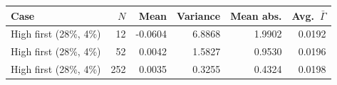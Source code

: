 \begin{tabular}{lrrrrr}
\toprule
Case & $N$ & Mean & Variance & Mean abs. & Avg.\ $\bar\Gamma$ \\
\midrule
High first (28\%, 4\%) & 12 & -0.0604 & 6.8868 & 1.9902 & 0.0192 \\
High first (28\%, 4\%) & 52 & 0.0042 & 1.5827 & 0.9530 & 0.0196 \\
High first (28\%, 4\%) & 252 & 0.0035 & 0.3255 & 0.4324 & 0.0198 \\
\bottomrule
\end{tabular}
